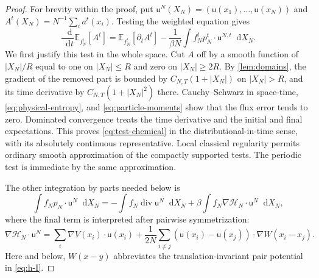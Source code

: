 \documentclass[11pt,reqno]{amsart}
\numberwithin{equation}{section}
\theoremstyle{definition}
\theoremstyle{remark}
\newcommand{\E}{\mathbb E}
\newcommand{\HN}{\mathcal H_N}
\renewcommand{\u}{\mathsf u}
\newcommand{\diver}{\operatorname{div}}
\newcommand{\dd}{\mathop{}\!\mathrm d}
\begin{document}
\begin{proof}
For brevity within the proof, put $\u^N(X_N)=(\u(x_1),\ldots,\u(x_N))$ and $A^t(X_N)=N^{-1}\sum_i a^t(x_i)$. Testing the weighted equation gives
\begin{equation}\label{eq:test-chemical}
 \frac{\dd}{\dd t}\E_{f_N^t}[A^t]
 =\E_{f_N^t}[\partial_t A^t]
      -\frac1{\beta N}\int f_N^t p_N^t\cdot \u^{N,t}\dd X_N.
\end{equation}
We first justify this test in the whole space. Cut $A$ off by a smooth function of $|X_N|/R$ equal to one on $|X_N|\leq R$ and zero on $|X_N|\geq2R$. By \cref{lem:domains}, the gradient of the removed part is bounded by $C_{N,T}(1+|X_N|)$ on $|X_N|>R$, and its time derivative by $C_{N,T}(1+|X_N|^2)$ there. Cauchy--Schwarz in space-time, \eqref{eq:physical-entropy}, and \eqref{eq:particle-moments} show that the flux error tends to zero. Dominated convergence treats the time derivative and the initial and final expectations. This proves \eqref{eq:test-chemical} in the distributional-in-time sense, with its absolutely continuous representative. Local classical regularity permits ordinary smooth approximation of the compactly supported tests. The periodic test is immediate by the same approximation.

The other integration by parts needed below is
\begin{equation}\label{eq:score-ibp}
 \int f_N p_N\cdot \u^N\dd X_N
 =-\int f_N\diver \u^N\dd X_N
       +\beta\int f_N\nabla \HN\cdot \u^N\dd X_N,
\end{equation}
where the final term is interpreted after pairwise symmetrization:
\begin{equation}\label{eq:symmetrized-force}
 \nabla \HN\cdot \u^N
 =\sum_i\nabla V(x_i)\cdot \u(x_i)
       +\frac1{2N}\sum_{i\ne j}
                  (\u(x_i)-\u(x_j))\cdot\nabla W(x_i-x_j).
\end{equation}
Here and below, $W(x-y)$ abbreviates the translation-invariant pair potential in \eqref{eq:h-I}.


\end{proof}
\end{document}
